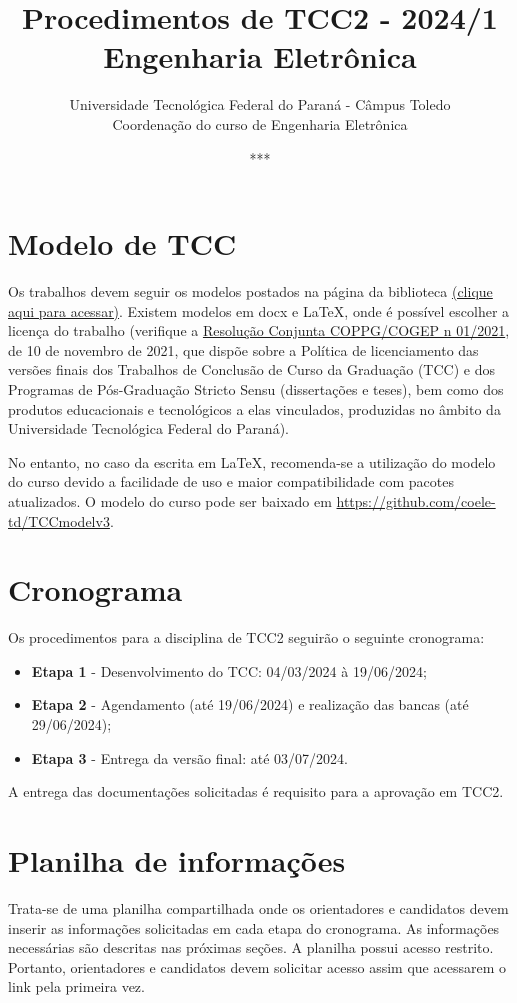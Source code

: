 \documentclass[a4paper, 12pt]{article}
\title{Procedimentos de TCC2 - 2024/1\\\textbf{Engenharia Eletrônica}}
\date{***}
\author{Universidade Tecnológica Federal do Paraná - Câmpus Toledo\\Coordenação do curso de Engenharia Eletrônica}
\newcommand{\startdate}{04/03/2024}		%
\newcommand{\agendadate}{19/06/2024}	%
\newcommand{\bancadate}{29/06/2024}		%
\newcommand{\finaldate}{03/07/2024}		%
\begin{document}
    \maketitle
    
    \section{Modelo de TCC}
    Os trabalhos devem seguir os modelos postados na página da biblioteca \href{http://portal.utfpr.edu.br/biblioteca/trabalhos-academicos}{(clique aqui para acessar)}. Existem modelos em docx e \LaTeX, onde é possível escolher a licença do trabalho (verifique a \href{https://sei.utfpr.edu.br/sei/publicacoes/controlador_publicacoes.php?acao=publicacao_visualizar&id_documento=2615190&id_orgao_publicacao=0}{Resolução Conjunta COPPG/COGEP n\textordmasculine{} 01/2021}, de 10 de novembro de 2021, que dispõe sobre a Política de licenciamento das versões finais dos Trabalhos de Conclusão de Curso da Graduação (TCC) e dos Programas de Pós-Graduação Stricto Sensu (dissertações e teses), bem como dos produtos educacionais e tecnológicos a elas vinculados, produzidas no âmbito da Universidade Tecnológica Federal do Paraná).

	No entanto, no caso da escrita em \LaTeX{}, recomenda-se a utilização do modelo do curso devido a facilidade de uso e maior compatibilidade com pacotes atualizados. O modelo do curso pode ser baixado em \url{https://github.com/coele-td/TCCmodelv3}.
    
    \section{Cronograma}
    \label{sec:CRO}
    
    Os procedimentos para a disciplina de TCC2 seguirão o seguinte cronograma:
    \begin{itemize}
    	\item \textbf{Etapa 1} - Desenvolvimento do TCC: \startdate{} à \agendadate;
    	\item \textbf{Etapa 2} - Agendamento (até \agendadate) e realização das bancas (até \bancadate);
    	\item \textbf{Etapa 3} - Entrega da versão final: até \finaldate.    	
    \end{itemize}

	A entrega das documentações solicitadas é requisito para a aprovação em TCC2.

	\section{Planilha de informações}
	\label{sec:pla}
	Trata-se de uma planilha compartilhada onde os orientadores e candidatos devem inserir as informações solicitadas em cada etapa do cronograma. As informações necessárias são descritas nas próximas seções. A planilha possui acesso restrito. Portanto, orientadores e candidatos devem solicitar acesso assim que acessarem o link pela primeira vez.
	
\end{document}

